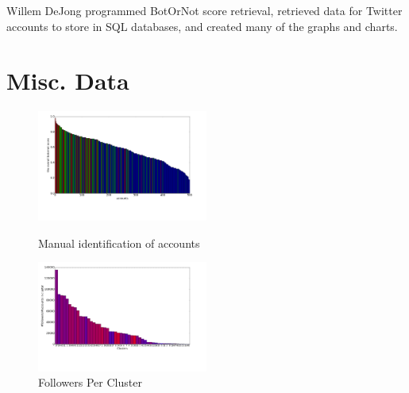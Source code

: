 \documentclass{sig-alternate-05-2015}
\begin{document}
Willem DeJong programmed BotOrNot score retrieval, retrieved data for Twitter accounts to store in SQL databases, and created many of the graphs and charts.

\section{Misc. Data}

\begin{figure}[h!]
	\caption{Manual identification of accounts}
	\centering
		\includegraphics[width=0.5\textwidth]{imgs/barvsaccnt}
	\label{fig:barvsaccnt}
\end{figure}

\begin{figure}[h!]
	\caption{Followers Per Cluster}
	\centering
		\includegraphics[width=0.5\textwidth]{imgs/followers}
\end{figure}

\end{document}
